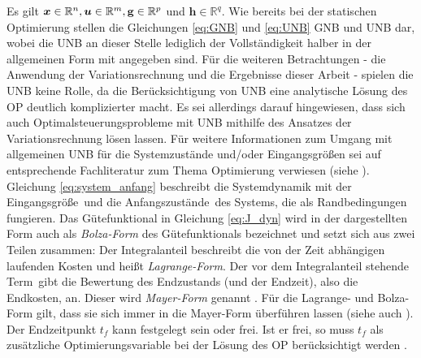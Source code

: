 Es gilt $\boldsymbol{x}\in\mathbb{R}^n, \boldsymbol{u}\in\mathbb{R}^m, \mathbf{g}\in\mathbb{R}^p$ und $\mathbf{h}\in\mathbb{R}^q$. Wie bereits bei der statischen Optimierung stellen die Gleichungen \eqref{eq:GNB} und \eqref{eq:UNB} \gls{GNB} und \gls{UNB} dar, wobei die \gls{UNB} an dieser Stelle lediglich der Vollständigkeit halber in der allgemeinen Form mit angegeben sind. Für die weiteren Betrachtungen - die Anwendung der Variationsrechnung und die Ergebnisse dieser Arbeit - spielen die \gls{UNB} keine Rolle, da die Berücksichtigung von \gls{UNB} eine analytische Lösung des \gls{OP} deutlich komplizierter macht. Es sei allerdings darauf hingewiesen, dass sich auch Optimalsteuerungsprobleme mit \gls{UNB} mithilfe des Ansatzes der Variationsrechnung lösen lassen. Für weitere Informationen zum Umgang mit allgemeinen \gls{UNB} für die Systemzustände und/oder Eingangsgrößen sei auf entsprechende Fachliteratur zum Thema Optimierung verwiesen (siehe \cite{Papageorgiou.2012, Gerdts.2010}). Gleichung \eqref{eq:system_anfang} beschreibt die Systemdynamik mit der Eingangsgröße \uoft\,und die Anfangszustände \xzero\,des Systems, die als Randbedingungen fungieren. Das Gütefunktional in Gleichung \eqref{eq:J_dyn} wird in der dargestellten Form auch als \textit{Bolza-Form} des Gütefunktionals bezeichnet und setzt sich aus zwei Teilen zusammen: Der Integralanteil beschreibt die von der Zeit abhängigen laufenden Kosten und heißt \textit{Lagrange-Form}. Der vor dem Integralanteil stehende Term \Vofxoftf\,gibt die Bewertung des Endzustands (und der Endzeit), also die Endkosten, an. Dieser wird \textit{Mayer-Form} genannt \cite{KnutGraichen.2012}. Für die Lagrange- und Bolza-Form gilt, dass sie sich immer in die Mayer-Form überführen lassen \cite{KnutGraichen.2012} (siehe auch \cite{Gerdts.2010}). Der Endzeitpunkt $t_f$ kann festgelegt sein oder frei. Ist er frei, so muss $t_f$ als zusätzliche Optimierungsvariable bei der Lösung des \gls{OP} berücksichtigt werden \cite{KnutGraichen.2012}. 
